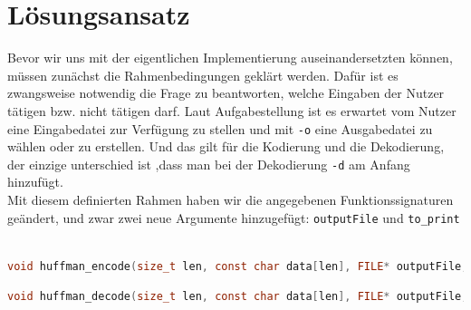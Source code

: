\documentclass[course=erap]{aspdoc}
\begin{document}
\section{Lösungsansatz}
Bevor wir uns mit der eigentlichen Implementierung auseinandersetzten können, müssen zunächst die
Rahmenbedingungen geklärt werden. Dafür ist es zwangsweise notwendig die Frage zu beantworten, welche Eingaben der Nutzer tätigen bzw. nicht tätigen darf. Laut Aufgabestellung ist es erwartet vom Nutzer eine Eingabedatei zur Verfügung zu stellen und mit \verb+-o+ eine Ausgabedatei zu wählen oder zu erstellen.
Und das gilt für die Kodierung und die Dekodierung, der einzige unterschied ist ,dass man bei der Dekodierung \verb+-d+ am Anfang hinzufügt. \\
Mit diesem definierten Rahmen haben wir die angegebenen Funktionssignaturen geändert, und zwar zwei neue Argumente hinzugefügt: \verb+outputFile+ und \verb+to_print+ \\ \\
\begin{lstlisting}[language=c, numbers=none, frame=none]
void huffman_encode(size_t len, const char data[len], FILE* outputFile, int to_print)
\end{lstlisting}
\begin{lstlisting}[language=c, numbers=none, frame=none]
void huffman_decode(size_t len, const char data[len], FILE* outputFile, int to_print)
\end{lstlisting}
 
\end{document}
